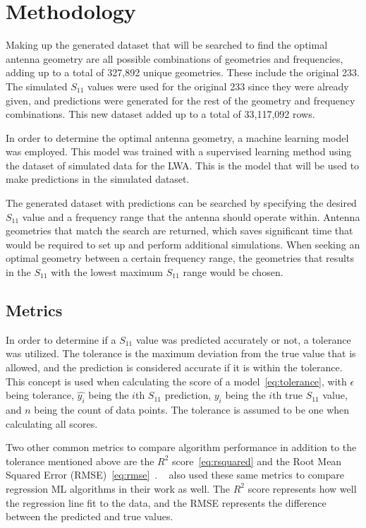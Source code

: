 \documentclass[conference]{IEEEtran}
\begin{document}
\section{Methodology}
Making up the generated dataset that will be searched to find the optimal antenna geometry are all possible combinations of geometries and frequencies, adding up to a total of 327,892 unique geometries. These include the original 233. The simulated $S_{11}$ values were used for the original 233 since they were already given, and predictions were generated for the rest of the geometry and frequency combinations. This new dataset added up to a total of 33,117,092 rows.

In order to determine the optimal antenna geometry, a machine learning model was employed. This model was trained with a supervised learning method using the dataset of simulated data for the LWA. This is the model that will be used to make predictions in the simulated dataset.
 
The generated dataset with predictions can be searched by specifying the desired $S_{11}$ value and a frequency range that the antenna should operate within. Antenna geometries that match the search are returned, which saves significant time that would be required to set up and perform additional simulations. When seeking an optimal geometry between a certain frequency range, the geometries that results in the $S_{11}$ with the lowest maximum $S_{11}$ range would be chosen.

\subsection{Metrics}
In order to determine if a $S_{11}$ value was predicted accurately or not, a tolerance was utilized. The tolerance is the maximum deviation from the true value that is allowed, and the prediction is considered accurate if it is within the tolerance. This concept is used when calculating the score of a model~\eqref{eq:tolerance}, with $\epsilon$ being tolerance, $\hat{y_i}$ being the $i$th $S_{11}$ prediction, $y_i$ being the $i$th true $S_{11}$ value, and $n$ being the count of data points. The tolerance is assumed to be one when calculating all scores.

Two other common metrics to compare algorithm performance in addition to the tolerance mentioned above are the $R^2$ score~\eqref{eq:rsquared} and the Root Mean Squared Error (RMSE)~\eqref{eq:rmse}~\cite{shcherbakov_survey_2013}. ~\cite{haque_machine_2023,m_el-kenawy_optimized_2022,ranjan_ultra-wideband_2022,sharma_machine_2020,jain_estimation_2022,jain_design_2024} also used these same metrics to compare regression ML algorithms in their work as well. The $R^2$ score represents how well the regression line fit to the data, and the RMSE represents the difference between the predicted and true values.
\end{document}

